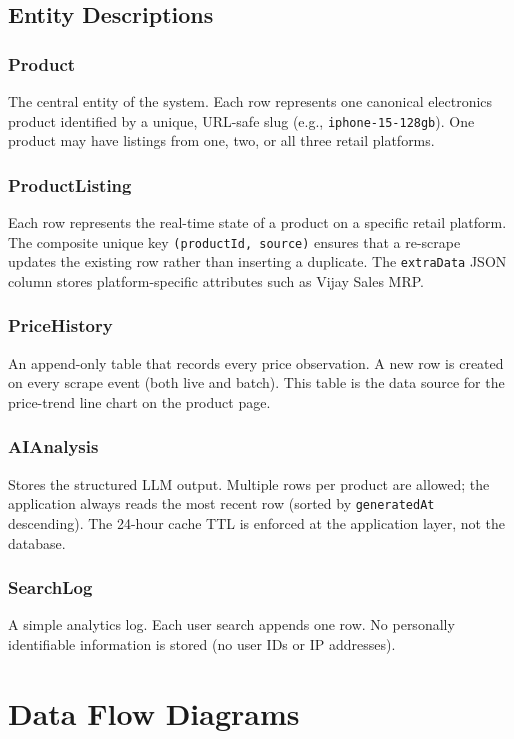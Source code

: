 \documentclass[12pt,a4paper]{report}
\begin{document}
\section{Entity Descriptions}

\subsection{Product}
The central entity of the system. Each row represents one canonical
electronics product identified by a unique, URL-safe slug
(e.g., \texttt{iphone-15-128gb}). One product may have listings from
one, two, or all three retail platforms.

\subsection{ProductListing}
Each row represents the real-time state of a product on a specific retail
platform. The composite unique key \texttt{(productId, source)} ensures that
a re-scrape updates the existing row rather than inserting a duplicate.
The \texttt{extraData} JSON column stores platform-specific attributes such
as Vijay Sales MRP.

\subsection{PriceHistory}
An append-only table that records every price observation. A new row is
created on every scrape event (both live and batch). This table is the data
source for the price-trend line chart on the product page.

\subsection{AIAnalysis}
Stores the structured LLM output. Multiple rows per product are allowed; the
application always reads the most recent row (sorted by
\texttt{generatedAt} descending). The 24-hour cache TTL is enforced at the
application layer, not the database.

\subsection{SearchLog}
A simple analytics log. Each user search appends one row. No personally
identifiable information is stored (no user IDs or IP addresses).

\chapter{Data Flow Diagrams}
\end{document}
